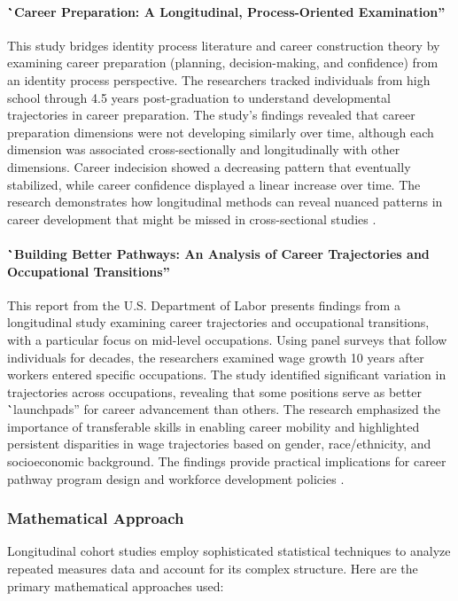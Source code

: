 \documentclass[../main.tex]{subfiles}
\begin{document}
\paragraph{\``Career Preparation: A Longitudinal, Process-Oriented Examination''}
This study bridges identity process literature and career construction theory by examining career preparation (planning, decision-making, and confidence) from an identity process perspective. The researchers tracked individuals from high school through 4.5 years post-graduation to understand developmental trajectories in career preparation. The study's findings revealed that career preparation dimensions were not developing similarly over time, although each dimension was associated cross-sectionally and longitudinally with other dimensions. Career indecision showed a decreasing pattern that eventually stabilized, while career confidence displayed a linear increase over time. The research demonstrates how longitudinal methods can reveal nuanced patterns in career development that might be missed in cross-sectional studies \parencite{porfeli2011career}.

\paragraph{\``Building Better Pathways: An Analysis of Career Trajectories and Occupational Transitions''}
This report from the U.S. Department of Labor presents findings from a longitudinal study examining career trajectories and occupational transitions, with a particular focus on mid-level occupations. Using panel surveys that follow individuals for decades, the researchers examined wage growth 10 years after workers entered specific occupations. The study identified significant variation in trajectories across occupations, revealing that some positions serve as better \``launchpads'' for career advancement than others. The research emphasized the importance of transferable skills in enabling career mobility and highlighted persistent disparities in wage trajectories based on gender, race/ethnicity, and socioeconomic background. The findings provide practical implications for career pathway program design and workforce development policies \parencite{dol2021pathways}.

\subsubsection{Mathematical Approach}

Longitudinal cohort studies employ sophisticated statistical techniques to analyze repeated measures data and account for its complex structure. Here are the primary mathematical approaches used:
\end{document}
